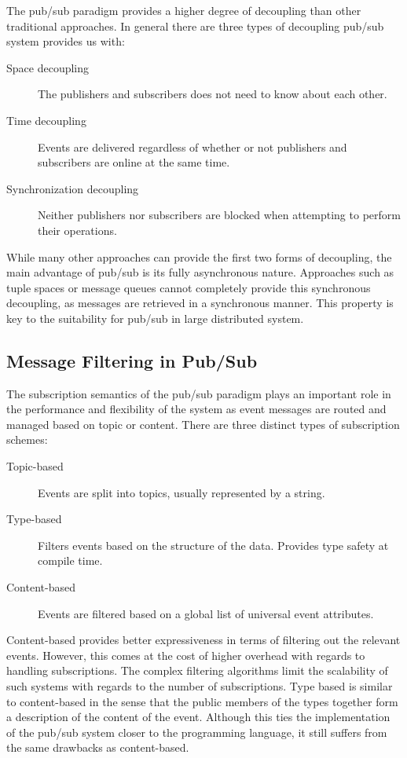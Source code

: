 The pub/sub paradigm provides a higher degree of decoupling than other
traditional approaches. In general there are three types of decoupling
pub/sub system provides us with:

\begin{description}
  \item[Space decoupling] The publishers and subscribers does not need to
    know about each other.
  \item[Time decoupling] Events are delivered regardless of whether or
    not publishers and subscribers are online at the same time.
  \item[Synchronization decoupling] Neither publishers nor subscribers
    are blocked when attempting to perform their operations.
\end{description}

While many other approaches can provide the first two forms of
decoupling, the main advantage of pub/sub is its fully asynchronous nature.
Approaches such as tuple spaces or message queues cannot completely
provide this synchronous decoupling, as messages are retrieved in a
synchronous manner. This property is key to the suitability for pub/sub
in large distributed system.~\cite{Eugster:2003}

\subsection{Message Filtering in Pub/Sub}

The subscription semantics of the pub/sub paradigm plays an important
role in the performance and flexibility of the system as event messages
are routed and managed based on topic or content. There are three
distinct types of subscription schemes:

\begin{description}
  \item[Topic-based] Events are split into topics, usually represented by
      a string.
  \item[Type-based] Filters events based on the structure of the data.
      Provides type safety at compile time.
  \item[Content-based] Events are filtered based on a global
      list of universal event attributes.
\end{description}

Content-based provides better expressiveness in terms of filtering out
the relevant events. However, this comes at the cost of higher overhead
with regards to handling subscriptions. The complex filtering algorithms
limit the scalability of such systems with regards to the number of
subscriptions. Type based is similar to content-based in the sense that
the public members of the types together form a description of the
content of the event. Although this ties the implementation of the
pub/sub system closer to the programming language, it still suffers from
the same drawbacks as content-based.

